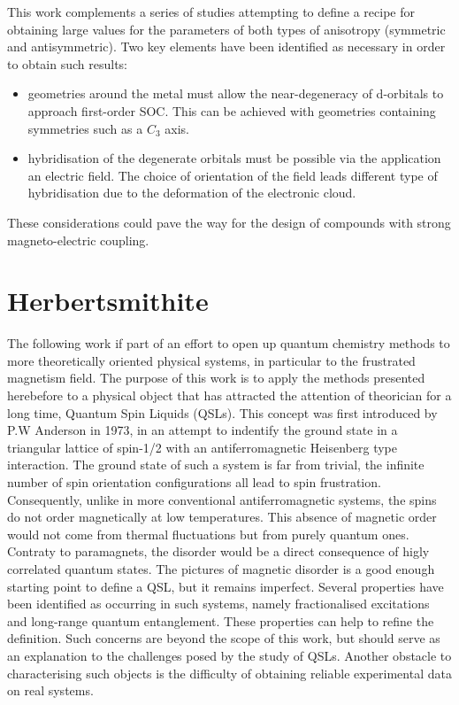 \documentclass[12pt]{report}
\numberwithin{equation}{section}
\begin{document}
\par This work complements a series of studies attempting to define a recipe for obtaining large values for the parameters of both types of anisotropy (symmetric and antisymmetric).
Two key elements have been identified as necessary in order to obtain such results:
\begin{itemize}
    \item[(i)] geometries around the metal must allow the near-degeneracy of d-orbitals to approach first-order SOC. This can be achieved with geometries containing symmetries such as a $C_3$ axis.
    \item[(ii)] hybridisation of the degenerate orbitals must be possible via the application an electric field. The choice of orientation of the field leads different type of hybridisation due to the deformation of the electronic cloud. 
\end{itemize}
These considerations could pave the way for the design of compounds with strong magneto-electric coupling.


\chapter{Herbertsmithite}

The following work if part of an effort to open up quantum chemistry methods to more theoretically oriented physical systems, in particular to the frustrated magnetism field.
The purpose of this work is to apply the methods presented herebefore to a physical object that has attracted the attention of theorician for a long time, Quantum Spin Liquids (QSLs).
This concept was first introduced by P.W Anderson in 1973\cite{anderson_resonating_1973}, in an attempt to indentify the ground state in a triangular lattice of spin-1/2 with an antiferromagnetic Heisenberg type interaction.
The ground state of such a system is far from trivial, the infinite number of spin orientation configurations all lead to spin frustration. 
Consequently, unlike in more conventional antiferromagnetic systems, the spins do not order magnetically at low temperatures.
This absence of magnetic order would not come from thermal fluctuations but from purely quantum ones. 
Contraty to paramagnets, the disorder would be a direct consequence of higly correlated quantum states.
The pictures of magnetic disorder is a good enough starting point to define a QSL, but it remains imperfect.
Several properties have been identified as occurring in such systems, namely fractionalised excitations and long-range quantum entanglement. 
These properties can help to refine the definition. 
Such concerns are beyond the scope of this work, but should serve as an explanation to the challenges posed by the study of QSLs.
Another obstacle to characterising such objects is the difficulty of obtaining reliable experimental data on real systems.
\end{document}
